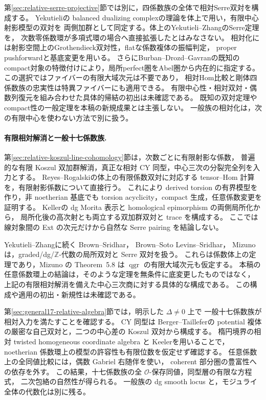 \documentclass[11pt,a4paper]{ltjsarticle}
\numberwithin{equation}{section}
\begin{document}
第\ref{sec:relative-serre-projective}節では別に，四係数族の全体で相対Serre双対を構成する。
Yekutieli\cite[Proposition~5.2, Corollary~5.5]{YekutieliBalanced}の
balanced dualizing complexの理論を体上で用い，有限中心射影模型の双対を
両側加群として同定する。体上のYekutieli--ZhangのSerre定理を，
次数零係数環が多項式環の場合へ直接拡張したとはみなさない。
相対化には射影空間上のGrothendieck双対性，flatな係数複体の振幅判定，
proper pushforwardと基底変更を用いる\cite{StacksRelativeDuality}。
さらにBurban--Drozd--Gavran\cite[Theorem~3.14]{BDGMinors}の既知の
compact対象の特徴付けにより，局所perfect圏をAbel圏から内在的に指定する。
この選択ではファイバーの有限大域次元は不要であり，
相対Hom比較と剛体四係数族の忠実性は特異ファイバーにも適用できる。
有限中心性・相対双対・偶数列復元を組み合わせた具体的帰結の初出は未確認である。
既知の双対定理やcompact性の一般定理を本稿の新規成果とは主張しない。
一般族の相対化は，次の有限中心を使わない方法で別に扱う。

\paragraph{有限相対解消と一般十七係数族.}
第\ref{sec:relative-koszul-line-cohomology}節は，次数ごとに有限射影な係数，
普遍的な有限 Koszul 双加群解消，真正な相対 CY 同型，中心三次の分裂完全列を入力とする。
Reyes--Rogalski\cite[Proposition~4.12]{RRGeneralizedAS}の体上の有限係数双対に対応する
tensor--Hom 計算を，有限射影係数について直接行う。
これにより derived torsion の有界模型を作り，非 noetherian 基底でも
torsion acyclicity，compact 生成，任意係数変更を証明する。
Keller\cite[Theorems~3.4,3.8(c)]{KellerDgCategories}の dg Morita 表示と
homological epimorphism の両側局所化から，
局所化後の高次射とも両立する双加群双対と trace を構成する。
ここでは線対象間の Ext の次元だけから自然な Serre pairing を結論しない。

Yekutieli--Zhang\cite{YZ}に続く Brown--Sridhar\cite{BrownSridharSerre}，
Brown--Soto Levins--Sridhar\cite{BrownSotoSridharBalanced}，
Mizuno\cite{MizunoZDuality}は，graded/dg/$\mathbb Z$-代数の局所双対と Serre 双対を扱う。
これらは係数体上の定理であり，Mizuno の Theorem~5.8 は
$\operatorname{qgr}$ の有限大域次元も仮定する。
本稿の任意係数環上の結論は，そのような定理を無条件に底変更したものではなく，
上記の有限相対解消を備えた中心三次商に対する具体的な構成である。
この構成や適用の初出・新規性は未確認である。

第\ref{sec:general17-relative-algebra}節では，明示した $\Delta\ne0$ 上で
一般十七係数族が相対入力を満たすことを確認する。
CY 同型は Berger--Taillefer\cite[arXiv v2, Theorem~3.6 の証明]{BT}の
potential 複体の厳密な自己双対と，二つの中心差の Koszul 双対から構成する。
楕円境界の相対 twisted homogeneous coordinate algebra と
Keeler\cite[Theorems~1.3,7.14]{KeelerAmpleFilters}を用いることで，
noetherian 係数環上の模型の許容性も有限位数を仮定せず確認する。
任意係数上の全同値比較には，偶数 Gabriel 右随伴を使い，
coherent 部分圏の豊富性への依存を外す。
この結果，十七係数族の全 $\mathcal O$-保存同値，同型層の有限な方程式，
二次包絡の自然性が得られる。
一般族の dg smooth locus と，モジュライ全体の代数化は別に残る。
\end{document}
